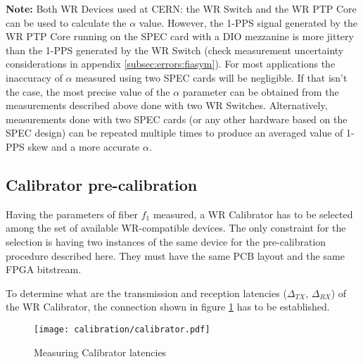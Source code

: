 {\bf Note:} Both WR Devices used at CERN: the WR Switch and the WR PTP Core can
be used to calculate the $\alpha$ value. However, the 1-PPS signal generated by
the WR PTP Core running on the SPEC card with a DIO mezzanine is more jittery
than the 1-PPS generated by the WR Switch (check measurement uncertainty
considerations in appendix \ref{subsec:errors:fiasym}). For most applications
the inaccuracy of $\alpha$ measured using two SPEC cards will be negligible. If
that isn't the case, the most precise value of the $\alpha$ parameter can be
obtained from the measurements described above done with two WR Switches.
Alternatively, measurements done with two SPEC cards (or any other hardware
based on the SPEC design) can be repeated multiple times to produce an averaged
value of 1-PPS skew and a more accurate $\alpha$.


\subsection{Calibrator pre-calibration}
\label{sec:procedure:calibrator}

Having the parameters of fiber $f_1$ measured, a WR Calibrator has to be
selected among the set of available WR-compatible devices. The only
constraint for the selection is having two instances of the same device
for the pre-calibration procedure described here. They must have the
same PCB layout and the same FPGA bitstream.

To determine what are the transmission and reception latencies ($\Delta_{TX}$,
$\Delta_{RX}$) of the WR Calibrator, the connection shown in figure
\ref{fig:calibrator} has to be established.

\begin{figure}[ht]
	\begin{center}
		\texttt{[image: calibration/calibrator.pdf]}
		\caption{Measuring Calibrator latencies}
		\label{fig:calibrator}
	\end{center}
\end{figure}

